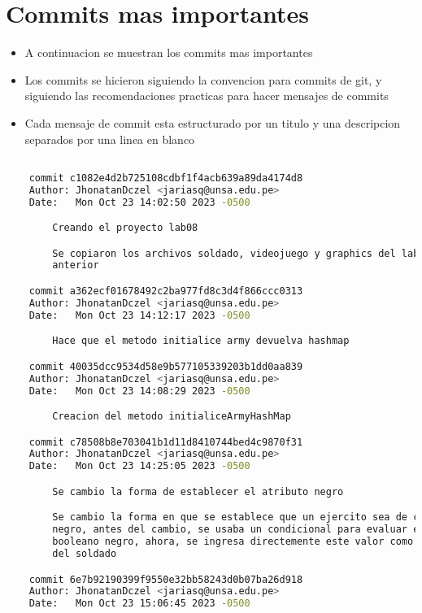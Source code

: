 \section{Commits mas importantes}
\begin{itemize}
  \item A continuacion se muestran los commits mas importantes
  \item Los commits se hicieron siguiendo la convencion para commits de git, y siguiendo las recomendaciones practicas para hacer mensajes de commits
    \item Cada mensaje de commit esta estructurado por un titulo y una descripcion separados por una linea en blanco
\end{itemize}


\begin{lstlisting}[language=bash, caption={commits mas importantes}]

    commit c1082e4d2b725108cdbf1f4acb639a89da4174d8
    Author: JhonatanDczel <jariasq@unsa.edu.pe>
    Date:   Mon Oct 23 14:02:50 2023 -0500

        Creando el proyecto lab08

        Se copiaron los archivos soldado, videojuego y graphics del laboratorio
        anterior

    commit a362ecf01678492c2ba977fd8c3d4f866ccc0313
    Author: JhonatanDczel <jariasq@unsa.edu.pe>
    Date:   Mon Oct 23 14:12:17 2023 -0500

        Hace que el metodo initialice army devuelva hashmap

    commit 40035dcc9534d58e9b577105339203b1dd0aa839
    Author: JhonatanDczel <jariasq@unsa.edu.pe>
    Date:   Mon Oct 23 14:08:29 2023 -0500

        Creacion del metodo initialiceArmyHashMap

    commit c78508b8e703041b1d11d8410744bed4c9870f31
    Author: JhonatanDczel <jariasq@unsa.edu.pe>
    Date:   Mon Oct 23 14:25:05 2023 -0500

        Se cambio la forma de establecer el atributo negro

        Se cambio la forma en que se establece que un ejercito sea de color
        negro, antes del cambio, se usaba un condicional para evaluar el valor
        booleano negro, ahora, se ingresa directemente este valor como atributo
        del soldado

    commit 6e7b92190399f9550e32bb58243d0b07ba26d918
    Author: JhonatanDczel <jariasq@unsa.edu.pe>
    Date:   Mon Oct 23 15:06:45 2023 -0500


\end{lstlisting}
